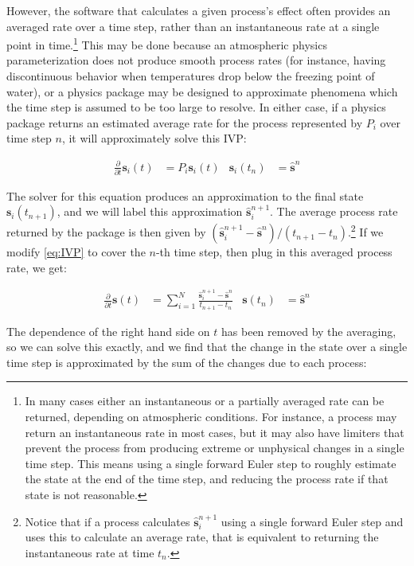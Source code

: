 \documentclass [11pt, proquest] {uwthesis}[2020/02/24]
\begin{document}
However, the software that calculates a given process's effect often provides an averaged rate over a time step, rather than an instantaneous rate at a single point in time.\footnote{In many cases either an instantaneous or a partially averaged rate can be returned, depending on atmospheric conditions. For instance, a process may return an instantaneous rate in most cases, but it may also have limiters that prevent the process from producing extreme or unphysical changes in a single time step. This means using a single forward Euler step to roughly estimate the state at the end of the time step, and reducing the process rate if that state is not reasonable.} This may be done because an atmospheric physics parameterization does not produce smooth process rates (for instance, having discontinuous behavior when temperatures drop below the freezing point of water), or a physics package may be designed to approximate phenomena which the time step is assumed to be too large to resolve. In either case, if a physics package returns an estimated average rate for the process represented by $P_i$ over time step $n$, it will approximately solve this IVP:

\begin{align}
    \frac{\partial}{\partial t} \mathbf{s}_i(t) &= P_i \mathbf{s}_i(t) & \mathbf{s}_i(t_n) &= \hat{\mathbf{s}}^n
\end{align}

The solver for this equation produces an approximation to the final state $\mathbf{s}_i(t_{n+1})$, and we will label this approximation $\hat{\mathbf{s}}^{n+1}_i$. The average process rate returned by the package is then given by $(\hat{\mathbf{s}}^{n+1}_i - \hat{\mathbf{s}}^n) / (t_{n+1} - t_n)$.\footnote{Notice that if a process calculates $\hat{\mathbf{s}}^{n+1}_i$ using a single forward Euler step and uses this to calculate an average rate, that is equivalent to returning the instantaneous rate at time $t_n$.} If we modify \eqref{eq:IVP} to cover the $n$-th time step, then plug in this averaged process rate, we get:

\begin{align}
    \frac{\partial}{\partial t} \mathbf{s}(t) &= \sum_{i=1}^{N} \frac{\hat{\mathbf{s}}^{n+1}_i - \hat{\mathbf{s}}^n}{t_{n+1} - t_n} & \mathbf{s}(t_n) &= \hat{\mathbf{s}}^n \label{eq:PS-final}
\end{align}

The dependence of the right hand side on $t$ has been removed by the averaging, so we can solve this exactly, and we find that the change in the state over a single time step is approximated by the sum of the changes due to each process:
\end{document}
